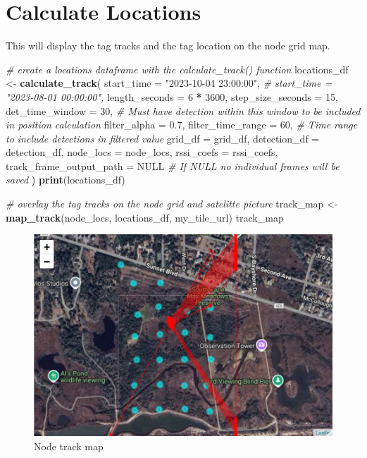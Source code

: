 \documentclass[
]{book}
\newenvironment{Shaded}{\begin{snugshade}}{\end{snugshade}}
\newcommand{\AttributeTok}[1]{\textcolor[rgb]{0.13,0.29,0.53}{#1}}
\newcommand{\CommentTok}[1]{\textcolor[rgb]{0.56,0.35,0.01}{\textit{#1}}}
\newcommand{\ConstantTok}[1]{\textcolor[rgb]{0.56,0.35,0.01}{#1}}
\newcommand{\DecValTok}[1]{\textcolor[rgb]{0.00,0.00,0.81}{#1}}
\newcommand{\FloatTok}[1]{\textcolor[rgb]{0.00,0.00,0.81}{#1}}
\newcommand{\FunctionTok}[1]{\textcolor[rgb]{0.13,0.29,0.53}{\textbf{#1}}}
\newcommand{\NormalTok}[1]{#1}
\newcommand{\OtherTok}[1]{\textcolor[rgb]{0.56,0.35,0.01}{#1}}
\newcommand{\SpecialCharTok}[1]{\textcolor[rgb]{0.81,0.36,0.00}{\textbf{#1}}}
\newcommand{\StringTok}[1]{\textcolor[rgb]{0.31,0.60,0.02}{#1}}
\begin{document}
\section{Calculate Locations}\label{calculate-locations}

This will display the tag tracks and the tag location on the node grid map.

\begin{Shaded}
\begin{Highlighting}[]
\CommentTok{\# create a locations dataframe with the calculate\_track() function}
\NormalTok{locations\_df }\OtherTok{\textless{}{-}} \FunctionTok{calculate\_track}\NormalTok{(}
  \AttributeTok{start\_time =} \StringTok{"2023{-}10{-}04 23:00:00"}\NormalTok{,}
  \CommentTok{\# start\_time = "2023{-}08{-}01 00:00:00",}
  \AttributeTok{length\_seconds =} \DecValTok{6} \SpecialCharTok{*} \DecValTok{3600}\NormalTok{,}
  \AttributeTok{step\_size\_seconds =} \DecValTok{15}\NormalTok{,}
  \AttributeTok{det\_time\_window =} \DecValTok{30}\NormalTok{, }\CommentTok{\# Must have detection within this window to be included in position calculation}
  \AttributeTok{filter\_alpha =} \FloatTok{0.7}\NormalTok{,}
  \AttributeTok{filter\_time\_range =} \DecValTok{60}\NormalTok{, }\CommentTok{\# Time range to include detections in filtered value}
  \AttributeTok{grid\_df =}\NormalTok{ grid\_df,}
  \AttributeTok{detection\_df =}\NormalTok{ detection\_df,}
  \AttributeTok{node\_locs =}\NormalTok{ node\_locs,}
  \AttributeTok{rssi\_coefs =}\NormalTok{ rssi\_coefs,}
  \AttributeTok{track\_frame\_output\_path =} \ConstantTok{NULL} \CommentTok{\# If NULL no individual frames will be saved}
\NormalTok{)}
\FunctionTok{print}\NormalTok{(locations\_df)}

\CommentTok{\# overlay the tag tracks on the node grid and satelitte picture}
\NormalTok{track\_map }\OtherTok{\textless{}{-}} \FunctionTok{map\_track}\NormalTok{(node\_locs, }
\NormalTok{                       locations\_df, }
\NormalTok{                       my\_tile\_url)}
\NormalTok{track\_map}
\end{Highlighting}
\end{Shaded}

\begin{figure}
\centering
\includegraphics{images/habitat_use_track_map.png}
\caption{Node track map}
\end{figure}
\end{document}
